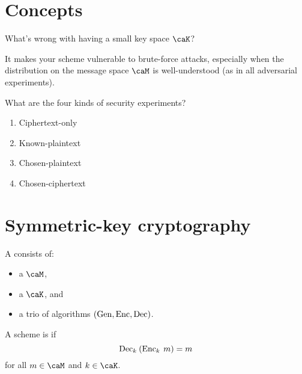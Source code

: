 \documentclass[a5paper]{article}
\begin{document}
\section{Concepts}
\label{sec:concepts}

\begin{note}
  \begin{field}
    What's wrong with having a small key space $\caK$?
  \end{field}

  \begin{field}
    It makes your scheme vulnerable to brute-force attacks, especially when the
    distribution on the message space $\caM$ is well-understood (as in all
    adversarial experiments).
  \end{field}
\end{note}

\begin{note}
  \begin{field}
    What are the four kinds of security experiments?
  \end{field}

  \begin{field}
    \begin{enumerate}%
      \itemsep0em
      \item Ciphertext-only
      \item Known-plaintext
      \item Chosen-plaintext
      \item Chosen-ciphertext
    \end{enumerate}
  \end{field}
\end{note}

\section{Symmetric-key cryptography}
\label{sec:symmetric}

\begin{definition*}
  A  consists of:
  \begin{itemize}
    \itemsep0em
    \item a  $\caM$,
    \item a  $\caK$, and
    \item a trio of algorithms $(\operatorname{Gen},\operatorname{Enc},\operatorname{Dec})$.
  \end{itemize}
  A scheme is  if
  \begin{equation*}
    \operatorname{Dec}_k\hspace{0.23em} (\operatorname{Enc}_k\hspace{0.23em} m)=m
  \end{equation*}
  for all $m\in\caM$ and $k\in\caK$.
\end{definition*}
\end{document}
